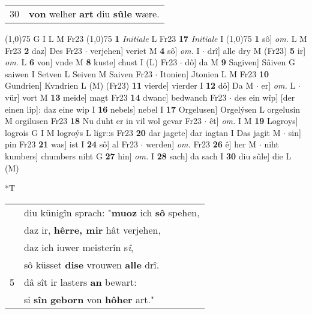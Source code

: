 \documentclass[8pt,a4paper,notitlepage]{article}
\begin{document}
\begin{table}[ht]
\begin{minipage}[t]{0.5\linewidth}
\begin{tabular}{rl}
30 & \textbf{von} welher \textbf{art} diu \textbf{sûle} wære.\\ 
\end{tabular}
\scriptsize
\line(1,0){75} \newline
G I L M Fr23 \newline
\line(1,0){75} \newline
\textbf{1} \textit{Initiale} L Fr23  \textbf{17} \textit{Initiale} I  \newline
\line(1,0){75} \newline
\textbf{1} sô] \textit{om.} L M Fr23 \textbf{2} daz] Des Fr23  $\cdot$ verjehen] veriet M \textbf{4} sô] \textit{om.} I  $\cdot$ drî] alle dry M (Fr23) \textbf{5} ir] \textit{om.} L \textbf{6} von] vnde M \textbf{8} kuste] chust I (L) Fr23  $\cdot$ dô] da M \textbf{9} Sagiven] Sâiven G saiwen I Setven L Seiven M Saiven Fr23  $\cdot$ Itonien] Jtonien L M Fr23 \textbf{10} Gundrien] Kvndrien L (M) (Fr23) \textbf{11} vierde] vierder I \textbf{12} dô] Da M  $\cdot$ er] \textit{om.} L  $\cdot$ vür] vort M \textbf{13} meide] magt Fr23 \textbf{14} dwanc] bedwanch Fr23  $\cdot$ des ein wîp] [der einen lip]: daz eine wip I \textbf{16} nebels] nebel I \textbf{17} Orgelusen] Orgelýsen L orgelusin M orgilusen Fr23 \textbf{18} Nu duht er in vil wol gevar Fr23  $\cdot$ êt] \textit{om.} I M \textbf{19} Logroys] logrois G I M logroýs L ligr::s Fr23 \textbf{20} dar jagete] dar iagtan I Das jagit M  $\cdot$ sin] pin Fr23 \textbf{21} was] ist I \textbf{24} sô] al Fr23  $\cdot$ werden] \textit{om.} Fr23 \textbf{26} ê] her M  $\cdot$ niht kumbers] chumbers niht G \textbf{27} hin] \textit{om.} I \textbf{28} sach] da sach I \textbf{30} diu sûle] die L (M) \newline
\end{minipage}
\hspace{0.5cm}
\begin{minipage}[t]{0.5\linewidth}
\small
\begin{center}*T
\end{center}
\begin{tabular}{rl}
 & diu künigîn sprach: "\textbf{muoz} ich \textbf{sô} spehen,\\ 
 & daz ir, \textbf{hêrre, mir} hât verjehen,\\ 
 & daz ich iuwer meisterîn s\textit{î},\\ 
 & sô küsset \textbf{dise} vrouwen \textbf{alle} drî.\\ 
5 & dâ sît ir lasters \textbf{an} bewart:\\ 
 & si \textbf{sîn} \textbf{geborn} von \textbf{hôher} art."\\ 

\end{tabular}
\end{minipage}
\end{table}
\end{document}
